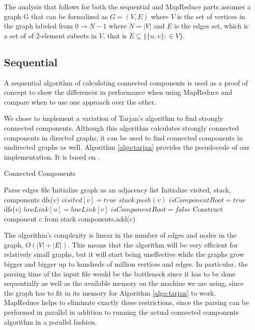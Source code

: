 The analysis that follows for both the sequential and MapReduce parts assumes a graph G that can be formalized as $G=(V,E)$ where $V$ is the set of vertices in the graph labeled from $0 \to N-1$ where $N=|V|$ and $E$ is the edges set, which is a set of of 2-element subsets in $V$, that is $E \subseteq \{\{u,v\}: \in V\}$.

\subsection{Sequential}
A sequential algorithm of calculating connected components is used as a proof of concept to show the differences in performance when using MapReduce and compare when to use one approach over the other.

We chose to implement a variation of Tarjan's algorithm to find strongly connected components. Although this algorithm calculates strongly connected components in directed graphs, it can be used to find connected components in undirected graphs as well. Algorithm \ref{algo:tarjan} provides the pseudocode of our implementation. It is based on \cite{tarjan}.

\begin{algorithm}
	\caption{Connected Components}
	\label{algo:tarjan}
	\begin{algorithmic}[1]
		\State Parse edges file
		\State Initialize graph as an adjacency list
		\State Initialize visited, stack, components
				\State dfs($v$)
			\EndIf
		\EndFor
			\State $visited[v] = true$
			\State $stack.push(v)$
			\State $isComponentRoot = true$
					\State dfs($v$)
				\EndIf
					\State $lowLink[u] = lowLink[v]$
					\State $isComponentRoot = false$
				\EndIf
			\EndFor
				\State Construct component c from stack
				\State components.add(c)
			\EndIf
		\EndFunction
	\end{algorithmic}
\end{algorithm}

The algorithm's complexity is linear in the number of edges and nodes in the graph, \ie $O(|V| + |E|)$. This means that the algorithm will be very efficient for relatively small graphs, but it will start being uneffective while the graphs grow bigger and bigger up to hundreds of million vertices and edges. In particular, the parsing time of the input file would be the bottleneck since it has to be done sequentially as well as the available memory on the machine we are using, since the graph has to fit in its memory for Algorithm \ref{algo:tarjan} to work. MapReduce helps to eliminate exactly these restrictions, since the parsing can be performed in parallel in addition to running the actual connected components algorithm in a parallel fashion.

